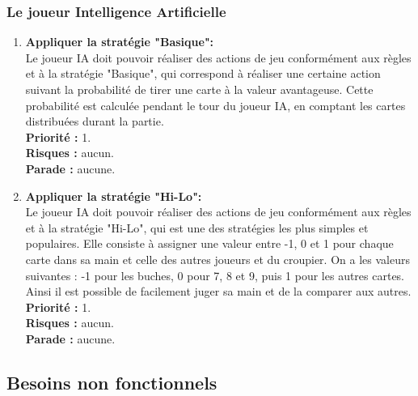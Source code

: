 \documentclass{article}
\begin{document}
\subsubsection{Le joueur Intelligence Artificielle}
\begin{enumerate}

\item \textbf{Appliquer la stratégie "Basique":} \\
    Le joueur IA doit pouvoir réaliser des actions de jeu conformément aux règles et à la stratégie "Basique", qui correspond à réaliser une certaine action suivant la probabilité de tirer une carte à la valeur avantageuse.
    Cette probabilité est calculée pendant le tour du joueur IA, en comptant les cartes distribuées durant la partie.\\
    \textbf{Priorité :} 1. \\
    \textbf{Risques :} aucun. \\ 
    \textbf{Parade :} aucune.
 
 \item \textbf{Appliquer la stratégie "Hi-Lo":} \\
    Le joueur IA doit pouvoir réaliser des actions de jeu conformément aux règles et à la stratégie "Hi-Lo", qui est une des stratégies les plus simples et populaires. 
    Elle consiste à assigner une valeur entre -1, 0 et 1 pour chaque carte dans sa main et celle des autres joueurs et du croupier. On a les valeurs suivantes : -1 pour les buches, 0 pour 7, 8 et 9, puis 1 pour les autres cartes. Ainsi il est possible de facilement juger sa main et de la comparer aux autres.\\
    \textbf{Priorité :} 1. \\ 
    \textbf{Risques :} aucun. \\ 
    \textbf{Parade :} aucune. 

\end{enumerate}

\subsection{Besoins non fonctionnels}
\end{document}
